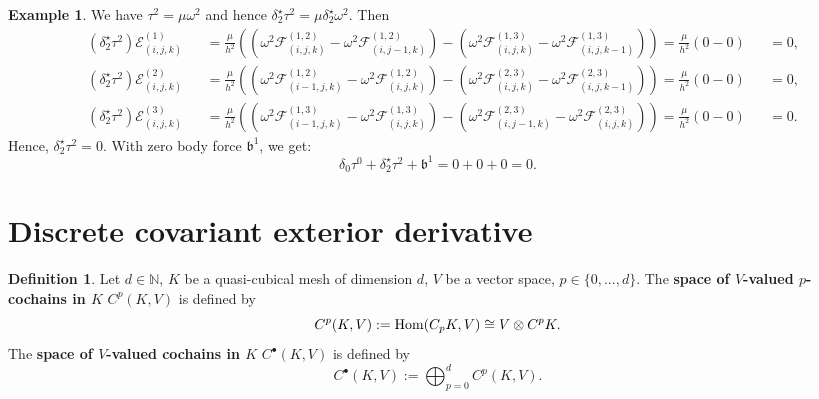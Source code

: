 \documentclass[fleqn]{article}
\theoremstyle{definition}
\newtheorem{definition}[theorem]{Definition}
\newtheorem{example}[theorem]{Example}
\newcommand{\N}{\mathbb{N}}
\newcommand{\Hom}{\mathop{\rm Hom}\nolimits}
\begin{document}
\begin{example}
  We have $\tau^2 = \mu \omega^2$ and hence
  $\delta_2^\star \tau^2 = \mu \delta_2^\star \omega^2$.
  Then
  \begin{subequations}
    \begin{alignat}{3}
      & (\delta_2^\star \tau^2) \mathcal{E}^{(1)}_{(i, j, k)}
      && =
        \frac{\mu}{h^2}
        (
          ( \omega^2 \mathcal{F}^{(1, 2)}_{(i, j, k)}
            - \omega^2 \mathcal{F}^{(1, 2)}_{(i, j - 1, k)}
          )
          -
          ( \omega^2 \mathcal{F}^{(1, 3)}_{(i, j, k)}
            - \omega^2 \mathcal{F}^{(1, 3)}_{(i, j, k - 1)}
          )
        )
      = \frac{\mu}{h^2} (0 - 0)
      && = 0, \\
%
      & (\delta_2^\star \tau^2) \mathcal{E}^{(2)}_{(i, j, k)}
      && =
        \frac{\mu}{h^2}
        (
          ( \omega^2 \mathcal{F}^{(1, 2)}_{(i - 1, j, k)}
            - \omega^2 \mathcal{F}^{(1, 2)}_{(i, j, k)}
          )
          -
          ( \omega^2 \mathcal{F}^{(2, 3)}_{(i, j, k)}
            - \omega^2 \mathcal{F}^{(2, 3)}_{(i, j, k - 1)}
          )
        )
      = \frac{\mu}{h^2} (0 - 0)
      &&  = 0, \\
%
      & (\delta_2^\star \tau^2) \mathcal{E}^{(3)}_{(i, j, k)}
      && =
        \frac{\mu}{h^2}
        (
          ( \omega^2 \mathcal{F}^{(1, 3)}_{(i - 1, j, k)}
            - \omega^2 \mathcal{F}^{(1, 3)}_{(i, j, k)}
          )
          -
          ( \omega^2 \mathcal{F}^{(2, 3)}_{(i, j - 1, k)}
            - \omega^2 \mathcal{F}^{(2, 3)}_{(i, j, k)}
          )
        )
      = \frac{\mu}{h^2} (0 - 0)
      && = 0.
    \end{alignat}
  \end{subequations}
  Hence, $\delta_2^\star \tau^2 = 0$.
  With zero body force $\mathfrak{b}^1$, we get:
  \begin{equation}
    \delta_0 \tau^0 + \delta_2^\star \tau^2 + \mathfrak{b}^1 = 0 + 0 + 0 = 0.
  \end{equation}
\end{example}

\section{Discrete covariant exterior derivative}
\begin{definition}
  Let
    $d \in \N$,
    $K$ be a quasi-cubical mesh of dimension $d$,
    $V$ be a vector space,
    $p \in \{0, ..., d\}$.
  The \textbf{space of $V$-valued $p$-cochains in $K$}
  $C^p(K, V)$ is defined by
  \begin{equation}
    C^p(K, V) := \Hom(C_p K, V) \cong V \otimes C^p K.
  \end{equation}
  The \textbf{space of $V$-valued cochains in $K$}
  $C^\bullet(K, V)$ is defined by
  \begin{equation}
    C^\bullet(K, V) := \bigoplus_{p = 0}^d C^p(K, V).
  \end{equation}
\end{definition}
\end{document}
